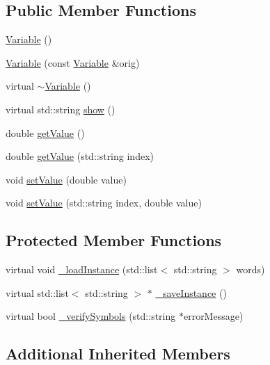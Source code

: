 \subsection*{Public Member Functions}
\begin{DoxyCompactItemize}
\item 
\hyperlink{class_variable_a5716c9dcafcc8cf59a6f6b5dac3ec7a2}{Variable} ()
\item 
\hyperlink{class_variable_a1974dd984e1ee5bf74f25d03301108c1}{Variable} (const \hyperlink{class_variable}{Variable} \&orig)
\item 
virtual \hyperlink{class_variable_acfc14d0ad77af53025f890b4d3a7745a}{$\sim$\-Variable} ()
\item 
virtual std\-::string \hyperlink{class_variable_a8bd0a772bb32fd630e252306306cd154}{show} ()
\item 
double \hyperlink{class_variable_a010d43b1092dbc6c3a1c2e0e3e4fc611}{get\-Value} ()
\item 
double \hyperlink{class_variable_a7f127c40dfbac529972ce03daf42a944}{get\-Value} (std\-::string index)
\item 
void \hyperlink{class_variable_a04078db9b38af4589e50ff4c6f468086}{set\-Value} (double value)
\item 
void \hyperlink{class_variable_a8403bc8f6c01702e1f3d6e0031731bca}{set\-Value} (std\-::string index, double value)
\end{DoxyCompactItemize}
\subsection*{Protected Member Functions}
\begin{DoxyCompactItemize}
\item 
virtual void \hyperlink{class_variable_a37db5791f858048daf0549d2ea3f3a62}{\-\_\-load\-Instance} (std\-::list$<$ std\-::string $>$ words)
\item 
virtual std\-::list$<$ std\-::string $>$ $\ast$ \hyperlink{class_variable_a67373d2c7210dd0cab25b4c4df1b5c0e}{\-\_\-save\-Instance} ()
\item 
virtual bool \hyperlink{class_variable_ad29a567d28d673450fb1ecd193bd8d90}{\-\_\-verify\-Symbols} (std\-::string $\ast$error\-Message)
\end{DoxyCompactItemize}
\subsection*{Additional Inherited Members}


